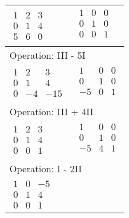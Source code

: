 \begin{longtable}{p{4cm}|p{3cm}}
    $\displaystyle\begin{matrix}
        1 & 2 & 3 \\
        0 & 1 & 4 \\
        5 & 6 & 0
    \end{matrix}$&
    $\displaystyle\begin{matrix}
        1 & 0 & 0 \\
        0 & 1 & 0 \\
        0 & 0 & 1 \\
    \end{matrix}$\\\hline
    \multicolumn{2}{p{\dimexpr4cm+3cm+2\tabcolsep\relax}}{Operation: III - 5I} \\\hline\pagebreak[0]
    $\displaystyle\begin{matrix}
        1 & 2 & 3 \\
        0 & 1 & 4 \\
        0 & -4 & -15
    \end{matrix}$&
    $\displaystyle\begin{matrix}
        1 & 0 & 0 \\
        0 & 1 & 0 \\
        -5 & 0 & 1 \\
    \end{matrix}$\\\hline
    \multicolumn{2}{p{\dimexpr4cm+3cm+2\tabcolsep\relax}}{Operation: III + 4II} \\\hline\pagebreak[0]
    $\displaystyle\begin{matrix}
        1 & 2 & 3 \\
        0 & 1 & 4 \\
        0 & 0 & 1
    \end{matrix}$&
    $\displaystyle\begin{matrix}
        1 & 0 & 0 \\
        0 & 1 & 0 \\
        -5 & 4 & 1 \\
    \end{matrix}$\\\hline
    \multicolumn{2}{p{\dimexpr4cm+3cm+2\tabcolsep\relax}}{Operation: I - 2II} \\\hline\pagebreak[0]
    $\displaystyle\begin{matrix}
        1 & 0 & -5 \\
        0 & 1 & 4 \\
        0 & 0 & 1
    \end{matrix}$&

\end{longtable}
